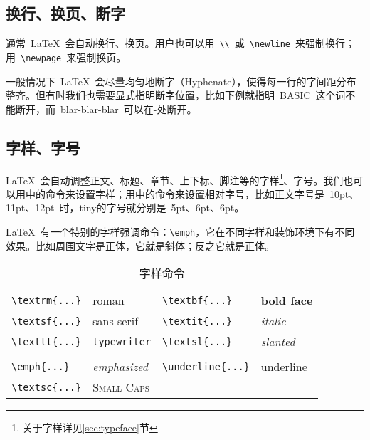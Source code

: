 \subsection{换行、换页、断字}
通常~\LaTeX~会自动换行、换页。用户也可以用~\verb|\\|~或~\verb|\newline|~来强制换行；用~\verb|\newpage|~来强制换页。

一般情况下~\LaTeX~会尽量均匀地断字（Hyphenate），使得每一行的字间距分布整齐。但有时我们也需要显式指明断字位置，比如下例就指明~BASIC~这个词不能断开，而~blar-blar-blar~可以在-处断开。
\begin{code}
\end{code}

\subsection{字样、字号}

\LaTeX~会自动调整正文、标题、章节、上下标、脚注等的字样\footnote{关于字样详见\ref{sec:typeface}节}、字号。我们也可以用中的命令来设置字样；用中的命令来设置相对字号，比如正文字号是~10pt、11pt、12pt~时，tiny的字号就分别是~5pt、6pt、6pt。

\LaTeX~有一个特别的字样强调命令：\verb|\emph|，它在不同字样和装饰环境下有不同效果。比如周围文字是正体，它就是斜体；反之它就是正体。

\begin{table}[hbtp]
\centering
\caption{字样命令}
\label{tab:typeface_command}
\begin{tabular}{llll}
    \toprule
    \verb|\textrm{...}| & \textrm{roman} & 
    \verb|\textbf{...}| & \textbf{bold face} \\
    \verb|\textsf{...}| & \textsf{sans serif} & 
    \verb|\textit{...}| & \textit{italic} \\
    \verb|\texttt{...}| & \texttt{typewriter} & 
    \verb|\textsl{...}| & \textsl{slanted} \\
    \\
    \verb|\emph{...}|   & \emph{emphasized} & 
    \verb|\underline{...}|  & \underline{underline} \\
    \verb|\textsc{...}| & \textsc{Small Caps} & & \\
    \bottomrule
\end{tabular}
\end{table}

